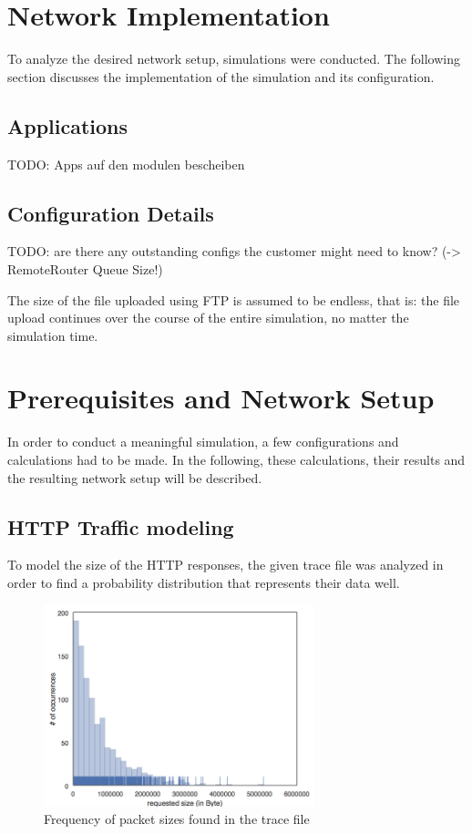 \documentclass[
10pt, %
a4paper, %
oneside, %
headinclude,footinclude, %
BCOR5mm, %
]{scrartcl}
\begin{document}
\section{Network Implementation}
To analyze the desired network setup, simulations were conducted. The following section discusses the implementation of the simulation and its configuration.


\subsection{Applications}
TODO: Apps auf den modulen bescheiben

\subsection{Configuration Details}

TODO: are there any outstanding configs the customer might need to know? (-> RemoteRouter Queue Size!)

The size of the file uploaded using FTP is assumed to be endless, that is: the file upload continues over the course of the entire simulation, no matter the simulation time.


\section{Prerequisites and Network Setup}

In order to conduct a meaningful simulation, a few configurations and calculations had to be made. In the following, these calculations, their results and the resulting network setup will be described.

\subsection{HTTP Traffic modeling}

To model the size of the HTTP responses, the given trace file was analyzed in order to find a probability distribution that represents their data well.

\begin{figure}[!ht]
  \centering
  \includegraphics[width=0.7\textwidth]{Figures/trace_plot.png}
  \caption{Frequency of packet sizes found in the trace file} \label{fig:first_plot}
\end{figure}
\end{document}

